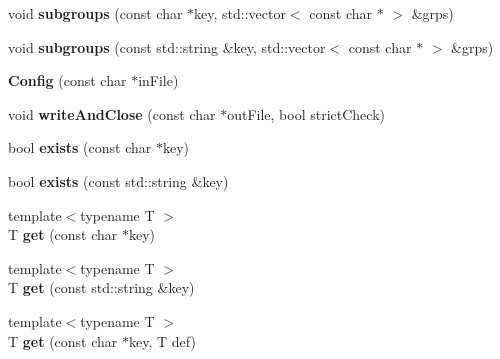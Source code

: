 \begin{DoxyCompactItemize}
\item 
\hypertarget{classConfig_a27543c26c56e81e436ed3d3b533f4b6e}{void {\bfseries subgroups} (const char $\ast$key, std\-::vector$<$ const char $\ast$ $>$ \&grps)}\label{classConfig_a27543c26c56e81e436ed3d3b533f4b6e}

\item 
\hypertarget{classConfig_a3950588dcea9c919e7f6d58c4904514d}{void {\bfseries subgroups} (const std\-::string \&key, std\-::vector$<$ const char $\ast$ $>$ \&grps)}\label{classConfig_a3950588dcea9c919e7f6d58c4904514d}

\item 
\hypertarget{classConfig_a17ddbd4edf9e5f8e130bb85370f0d8b7}{{\bfseries Config} (const char $\ast$in\-File)}\label{classConfig_a17ddbd4edf9e5f8e130bb85370f0d8b7}

\item 
\hypertarget{classConfig_a541a794277a0f2ad86fb965ccd27a2ae}{void {\bfseries write\-And\-Close} (const char $\ast$out\-File, bool strict\-Check)}\label{classConfig_a541a794277a0f2ad86fb965ccd27a2ae}

\item 
\hypertarget{classConfig_ac5e2bc2c541d36f5441c84bf25649ef6}{bool {\bfseries exists} (const char $\ast$key)}\label{classConfig_ac5e2bc2c541d36f5441c84bf25649ef6}

\item 
\hypertarget{classConfig_a6d0453bf1e96d0390521efbb0e904523}{bool {\bfseries exists} (const std\-::string \&key)}\label{classConfig_a6d0453bf1e96d0390521efbb0e904523}

\item 
\hypertarget{classConfig_a52e4ff571be6515ecea0f1b14794087f}{{\footnotesize template$<$typename T $>$ }\\T {\bfseries get} (const char $\ast$key)}\label{classConfig_a52e4ff571be6515ecea0f1b14794087f}

\item 
\hypertarget{classConfig_aaa2d3de617583fbbc65b4bbc1778ed94}{{\footnotesize template$<$typename T $>$ }\\T {\bfseries get} (const std\-::string \&key)}\label{classConfig_aaa2d3de617583fbbc65b4bbc1778ed94}

\item 
\hypertarget{classConfig_a6034829eb5be47b7b9d6a3d90f3a4f67}{{\footnotesize template$<$typename T $>$ }\\T {\bfseries get} (const char $\ast$key, T def)}\label{classConfig_a6034829eb5be47b7b9d6a3d90f3a4f67}


\end{DoxyCompactItemize}
